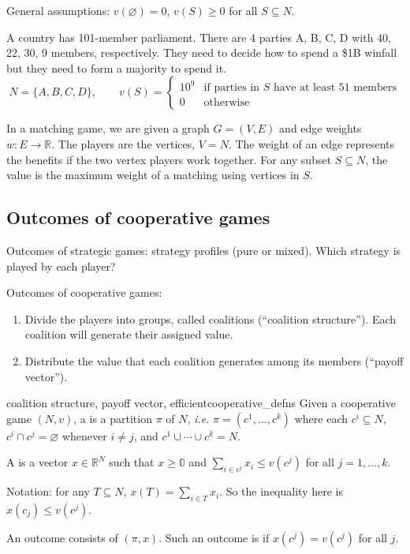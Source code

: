 \documentclass[12pt,letterpaper]{report}
\begin{document}
General assumptions: $v(\varnothing) = 0$, $v(S) \geq 0$ for all $S \subseteq N$.

\begin{ex}
  A country has 101-member parliament.
  There are 4 parties A, B, C, D with 40, 22, 30, 9 members, respectively.
  They need to decide how to spend a \$1B winfall but they need to form a majority to spend it.
  \[
    N = \{A, B, C, D\}, \qquad v(S) = \begin{cases}
      10^9 & \text{if parties in } S \text{ have at least 51 members} \\
      0 & \text{otherwise}
    \end{cases}
  \]
\end{ex}

\begin{ex}
  In a matching game, we are given a graph $G = (V, E)$ and edge weights
  $w \colon E \to \mathbb{R}$.
  The players are the vertices, $V = N$.
  The weight of an edge represents the benefits if the two vertex players work together.
  For any subset $S \subseteq N$, the value is the maximum weight of a matching using vertices in
  $S$.
\end{ex}

\subsection{Outcomes of cooperative games}

Outcomes of strategic games: strategy profiles (pure or mixed).
Which strategy is played by each player?

Outcomes of cooperative games:
\begin{enumerate}
  \item
  Divide the players into groups, called coalitions (``coalition structure'').
  Each coalition will generate their assigned value.
  \item
  Distribute the value that each coalition generates among its members (``payoff vector'').
\end{enumerate}

\begin{defn}{coalition structure, payoff vector, efficient}{cooperative_defns}
  Given a cooperative game $(N, v)$, a  is a partition $\pi$ of $N$,
  \emph{i.e.} $\pi = (c^1, \ldots, c^k)$ where each $c^i \subseteq N$, $c^i \cap c^j = \varnothing$
  whenever $i \neq j$, and $c^1 \cup \cdots \cup c^k = N$.

  A  is a vector $x \in \mathbb{R}^N$ such that $x \geq \mathbb{0}$ and
  $\sum\limits_{i \in c^j} x_i \leq v(c^j)$ for all $j = 1, \ldots, k$.

  Notation: for any $T \subseteq N$, $x(T) = \sum\limits_{i \in T} x_i$.
  So the inequality here is $x(c_j) \leq v(c^j)$.

  An outcome consists of $(\pi, x)$.
  Such an outcome is  if $x(c^j) = v(c^j)$ for all $j$.
\end{defn}
\end{document}
